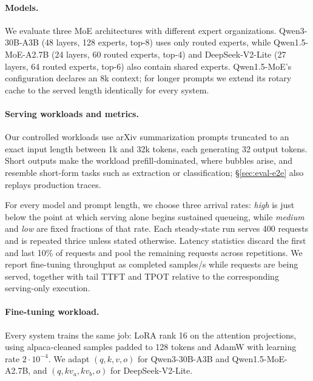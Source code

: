 \paragraph{Models.}
We evaluate three MoE architectures with different expert
organizations. Qwen3-30B-A3B (48 layers, 128 experts, top-8) uses only
routed experts, while Qwen1.5-MoE-A2.7B (24 layers, 60 routed experts,
top-4) and DeepSeek-V2-Lite (27 layers, 64 routed experts, top-6) also
contain shared experts. Qwen1.5-MoE's
configuration declares an 8k context; for longer prompts we extend its
rotary cache to the served length identically for every system.

\paragraph{Serving workloads and metrics.}
Our controlled workloads use arXiv summarization prompts truncated to
an exact input length between 1k and 32k tokens, each generating 32
output tokens. Short outputs make the workload prefill-dominated, where
bubbles arise, and resemble short-form tasks such as extraction or
classification; \S\ref{sec:eval-e2e} also replays production traces.

For every model and prompt length, we choose three arrival rates:
\emph{high} is just below the point at which serving alone begins
sustained queueing, while \emph{medium} and \emph{low} are fixed
fractions of that rate. Each steady-state run serves 400 requests and
is repeated thrice unless stated otherwise. Latency statistics discard
the first and last 10\% of requests and pool the remaining requests
across repetitions. We report fine-tuning throughput as completed
samples/s while requests are being served, together with tail
\ac{TTFT} and \ac{TPOT} relative to the corresponding serving-only
execution.

\paragraph{Fine-tuning workload.}
Every system trains the same job: LoRA rank 16 on the attention
projections, using alpaca-cleaned samples padded to 128 tokens and
AdamW with learning rate $2\cdot10^{-4}$. We adapt $(q,k,v,o)$ for
Qwen3-30B-A3B and Qwen1.5-MoE-A2.7B, and
$(q,kv_a,kv_b,o)$ for DeepSeek-V2-Lite.

